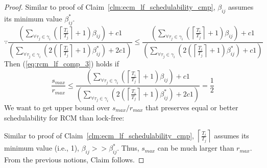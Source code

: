 \begin{proof}
Similar to proof of Claim~\ref{clm:ecm_lf_schedulability_cmp}, $\beta_{ij}$ assumes its minimum value $\beta_{ij}^*$. 
%
\begin{equation}
\because\frac{\left(\sum_{\forall\tau_{j}\in\gamma_{i}}\left(\left\lceil \frac{T_{i}}{T_{j}}\right\rceil +1\right)\beta_{ij}\right)+c1}{\left(\sum_{\forall\tau_{j}\in\gamma_{i}}\left(2\left(\left\lceil \frac{T_{i}}{T_{j}}\right\rceil +1\right)\beta_{ij}^{*}\right)+2c1\right)}\le\frac{\left(\sum_{\forall\tau_{j}\in\gamma_{i}}\left(\left\lceil \frac{T_{i}}{T_{j}}\right\rceil +1\right)\beta_{ij}\right)+c1}{\left(\sum_{\forall\tau_{j}\in\gamma_{i}}\left(2\left(\left\lceil \frac{T_{i}}{T_{j}}\right\rceil +1\right)\beta_{ij}^{*}\right)+c1\right)}
\end{equation}
%
Then (\ref{eq:rcm_lf_comp_3}) holds if 
\begin{equation}
\frac{s_{max}}{r_{max}} \le 
\frac{\left(\sum_{\forall\tau_{j}\in\gamma_{i}}\left(\left\lceil \frac{T_{i}}{T_{j}}\right\rceil +1\right)\beta_{ij}\right)+c1}{\left(\sum_{\forall\tau_{j}\in\gamma_{i}}\left(2\left(\left\lceil \frac{T_{i}}{T_{j}}\right\rceil +1\right)\beta_{ij}^{*}\right)+2c1\right)} = \frac{1}{2}
\end{equation}
%
We want to get upper bound over $s_{max}/r_{max}$ that preserves equal or better schedulability for RCM than lock-free:

Similar to proof of Claim~\ref{clm:ecm_lf_schedulability_cmp}, $\left\lceil\frac{T_i}{T_j}\right\rceil$ assumes its minimum value (i.e., 1), $\beta_{ij} >> \beta_{ij}^*$. Thus, $s_{max}$ can be much larger than $r_{max}$. From the previous notions, Claim follows.
%
\end{proof}
%
